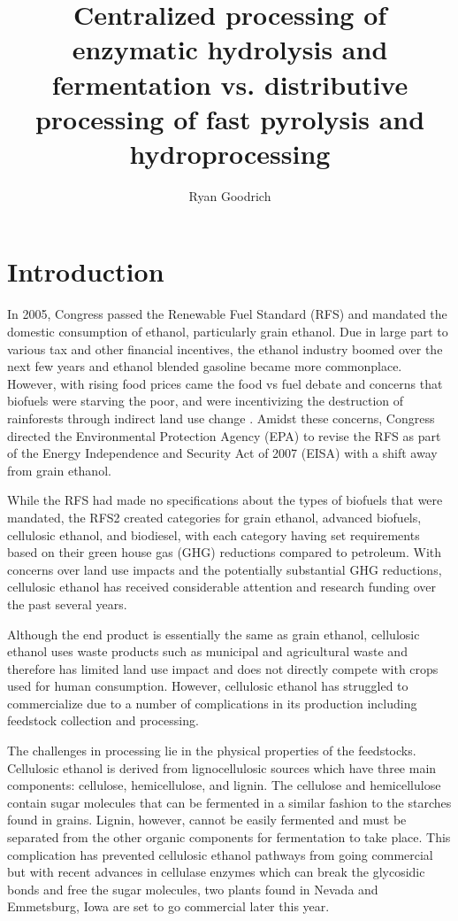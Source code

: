 \documentclass{article}\usepackage[]{graphicx}\usepackage[]{color}
\begin{document}
 \thispagestyle{empty}
\lhead{\today}

\title{Centralized processing of enzymatic hydrolysis and fermentation vs. distributive processing of fast pyrolysis and hydroprocessing}
\author{Ryan Goodrich}
\date{}
\maketitle

\section{Introduction}
In 2005, Congress passed the Renewable Fuel Standard (RFS) and mandated the domestic consumption of ethanol, particularly grain ethanol.  Due in large part to various tax and other financial incentives, the ethanol industry boomed over the next few years and ethanol blended gasoline became more commonplace.  However, with rising food prices came the food vs fuel debate and concerns that biofuels were starving the poor, \cite{Runge} and were incentivizing the destruction of rainforests through indirect land use change \cite{Searchinger}.  Amidst these concerns, Congress directed the Environmental Protection Agency (EPA) to revise the RFS as part of the Energy Independence and Security Act of 2007 (EISA) with a shift away from grain ethanol.

While the RFS had made no specifications about the types of biofuels that were mandated, the RFS2 created categories for grain ethanol, advanced biofuels, cellulosic ethanol, and biodiesel, with each category having set requirements based on their green house gas (GHG) reductions compared to petroleum.  With concerns over land use impacts and the potentially substantial GHG reductions, cellulosic ethanol has received considerable attention and research funding over the past several years.

Although the end product is essentially the same as grain ethanol, cellulosic ethanol uses waste products such as municipal and agricultural waste and therefore has limited land use impact and does not directly compete with crops used for human consumption.  However, cellulosic ethanol has struggled to commercialize due to a number of complications in its production including feedstock collection and processing.  

The challenges in processing lie in the physical properties of the feedstocks.  Cellulosic ethanol is derived from lignocellulosic sources which have three main components: cellulose, hemicellulose, and lignin.  The cellulose and hemicellulose contain sugar molecules that can be fermented in a similar fashion to the starches found in grains.  Lignin, however, cannot be easily fermented and must be separated from the other organic components for fermentation to take place.  This complication has prevented cellulosic ethanol pathways from going commercial but with recent advances in cellulase enzymes which can break the glycosidic bonds and free the sugar molecules, two plants found in Nevada and Emmetsburg, Iowa are set to go commercial later this year.
\end{document}
